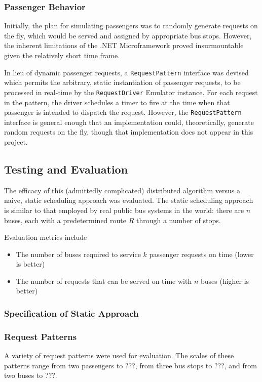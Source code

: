 \documentclass[runningheads]{llncs}
\begin{document}
\subsubsection{Passenger Behavior}
\label{sub:passengers}
Initially, the plan for simulating passengers was to randomly generate requests on the fly, which would be served and assigned by appropriate bus stops. However, the inherent limitations of the .NET Microframework proved insurmountable given the relatively short time frame.

In lieu of dynamic passenger requests, a \lstinline{RequestPattern} interface was devised which permits the arbitrary, static instantiation of passenger requests, to be processed in real-time by the \lstinline{RequestDriver} Emulator instance. For each request in the pattern, the driver schedules a timer to fire at the time when that passenger is intended to dispatch the request. However, the \lstinline{RequestPattern} interface is general enough that an implementation could, theoretically, generate random requests on the fly, though that implementation does not appear in this project.

\subsection{Testing and Evaluation}
The efficacy of this (admittedly complicated) distributed algorithm versus a naive, static scheduling approach was evaluated. The static scheduling approach is similar to that employed by real public bus systems in the world: there are $n$ buses, each with a predetermined route $R$ through a number of stops.

Evaluation metrics include
\begin{itemize}
	\item The number of buses required to service $k$ passenger requests on time (lower is better)
	\item The number of requests that can be served on time with $n$ buses (higher is better)
\end{itemize}

\subsubsection{Specification of Static Approach}

\subsubsection{Request Patterns}
A variety of request patterns were used for evaluation. The scales of these patterns range from two passengers to ???, from three bus stops to ???, and from two buses to ???.
\end{document}

